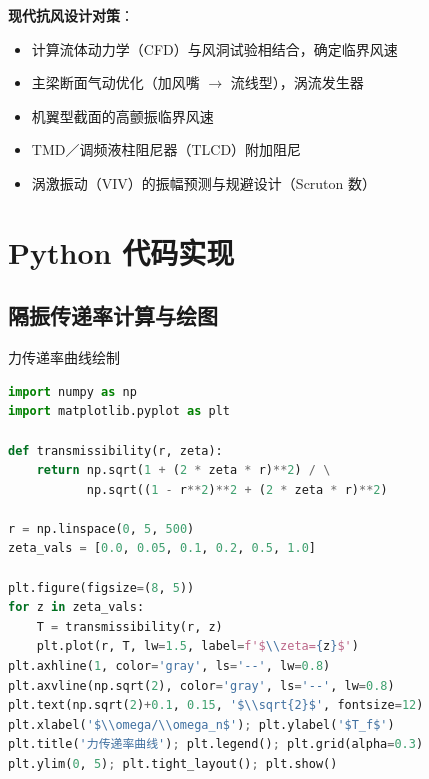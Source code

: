 \textbf{现代抗风设计对策}：
\begin{itemize}
    \item 计算流体动力学（CFD）与风洞试验相结合，确定临界风速
    \item 主梁断面气动优化（加风嘴 $\to$ 流线型），涡流发生器
    \item 机翼型截面的高颤振临界风速
    \item TMD／调频液柱阻尼器（TLCD）附加阻尼
    \item 涡激振动（VIV）的振幅预测与规避设计（Scruton 数）
\end{itemize}

\section{Python 代码实现}
\subsection{隔振传递率计算与绘图}
\begin{mycode}{力传递率曲线绘制}
\begin{lstlisting}[language=Python]
import numpy as np
import matplotlib.pyplot as plt

def transmissibility(r, zeta):
    return np.sqrt(1 + (2 * zeta * r)**2) / \
           np.sqrt((1 - r**2)**2 + (2 * zeta * r)**2)

r = np.linspace(0, 5, 500)
zeta_vals = [0.0, 0.05, 0.1, 0.2, 0.5, 1.0]

plt.figure(figsize=(8, 5))
for z in zeta_vals:
    T = transmissibility(r, z)
    plt.plot(r, T, lw=1.5, label=f'$\\zeta={z}$')
plt.axhline(1, color='gray', ls='--', lw=0.8)
plt.axvline(np.sqrt(2), color='gray', ls='--', lw=0.8)
plt.text(np.sqrt(2)+0.1, 0.15, '$\\sqrt{2}$', fontsize=12)
plt.xlabel('$\\omega/\\omega_n$'); plt.ylabel('$T_f$')
plt.title('力传递率曲线'); plt.legend(); plt.grid(alpha=0.3)
plt.ylim(0, 5); plt.tight_layout(); plt.show()
\end{lstlisting}
\end{mycode}

